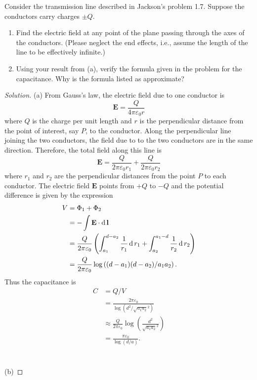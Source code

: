 \begin{problem}
Consider the transmission line described in Jackson's problem
1.7. Suppose the conductors carry charges $\pm Q$.
 \begin{enumerate}[noitemsep,label=(\alph*)]
\item Find the electric field at any point of the plane passing
  through the axes of the conductors. (Please neglect the end
  effects, i.e., assume the length of the line to be effectively
  infinite.)
\item Using your result from (a), verify the formula given in the
  problem for the capacitance. Why is the formula listed as
  approximate?
\end{enumerate}
\end{problem}
\begin{proof}[Solution]
(a) From Gauss's law, the electric field due to one conductor is
\begin{equation}
\label{eq:electric-field-conductor}
\textbf{E}=\frac{Q}{4\pi\varepsilon_0 r}
\end{equation}
where $Q$ is the charge per unit length and $r$ is the
perpendicular distance from the point of interest, say $P$, to
the conductor. Along the perpendicular line joining the two
conductors, the field due to to the two conductors are in the
same direction. Therefore, the total field along this line is
\begin{equation}
\label{eq:total-electric-field}
\mathbf{E}=\frac{Q}{2\pi\varepsilon_0
  r_1}+\frac{Q}{2\pi\varepsilon_0 r_2}
\end{equation}
where $r_1$ and $r_2$ are the perpendicular distances from the
point $P$ to each conductor. The electric field $\mathbf{E}$
points from $+Q$ to $-Q$ and the potential difference is given by
the expression
\begin{align*}
V&=\Phi_1+\Phi_2\\
 &=-\int\mathbf{E}\cdot\operatorname{d}\mathbf{l}\\
 &=\frac{Q}{2\pi\varepsilon_0}
   \left(\int_{a_1}^{d-a_2}\frac{1}{r_1}\operatorname{d}
   r_1+\int_{a_2}^{a_1-d}\frac{1}{r_2}\operatorname{d} r_2\right)\\
 &=\frac{Q}{2\pi\varepsilon_0}\log\left((d-a_1)(d-a_2)/a_1a_2\right).
\end{align*}
Thus the capacitance is
\begin{align*}
C&=Q/V\\
 &=\frac{2\pi\varepsilon_0}{\log\left(d^2/\sqrt{a_1a_2}^2\right)}\\
 &\approx
 \frac{Q}{2\pi\varepsilon_0}{\log\left(\frac{d^2}{\sqrt{a_1a_2}^2}\right)}\\
 &=\frac{\pi\varepsilon_0}{\log(d/a)}.
\end{align*}
\\\\
(b)
\end{proof}
\newpage

